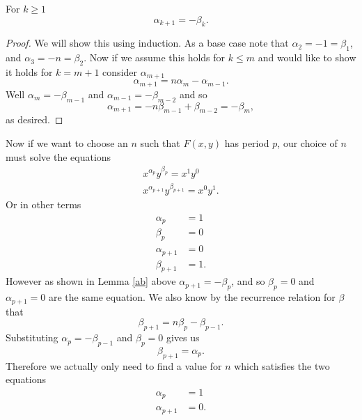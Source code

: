 \documentclass[12pt]{article}
\begin{document}
\begin{lemma} 
\label{ab} For $k\geq 1$
\begin{equation*}
\alpha_{k+1} = - \beta_{k}.
\end{equation*}
\end{lemma}
\begin{proof}
We will show this using induction. As a base case note that $\alpha_2 = -1 = \beta_1$, and $\alpha_3 = -n = \beta_2$. Now if we assume this holds for $k \leq m$ and would like to show it holds for $k = m+1$ consider $\alpha_{m+1}$
\begin{equation*}
\alpha_{m+1} = n \alpha_{m} - \alpha_{m-1}.
\end{equation*}
Well $\alpha_m = -\beta_{m-1}$ and $\alpha_{m-1} = - \beta_{m-2}$ and so 
\begin{equation*}
\alpha_{m+1} = - n \beta_{m-1} + \beta_{m-2} = -\beta_{m},
\end{equation*}
as desired.
\end{proof}
Now if we want to choose an $n$ such that  $F(x,y)$ has period $p$, our choice of $n$ must solve the equations 
\begin{align*}
x^{\alpha_p} y^{\beta_p} = x^{1}y^{0} \\
x^{\alpha_{p+1}} y^{\beta_{p+1}} = x^{0}y^{1}.
\end{align*}
Or in other terms
\begin{align*}
\alpha_p &=1 \\
\beta_p &=0\\ 
\alpha_{p+1} &= 0 \\
\beta_{p+1} &= 1.
\end{align*}
However as shown in Lemma \ref{ab} above $\alpha_{p+1} = -\beta_p$, and so $\beta_p=0$ and $\alpha_{p+1} =0$ are the same equation.  We also know by the recurrence relation for $\beta$ that 
\begin{equation*}
\beta_{p+1} = n \beta_{p} - \beta_{p-1}.
\end{equation*}
Substituting $\alpha_p = -\beta_{p-1}$ and $\beta_{p}=0$ gives us 
\begin{equation*}
\beta_{p+1} = \alpha_p.
\end{equation*} 
Therefore we actually only need to find a value for $n$ which satisfies the two equations
\begin{align*}
\alpha_p &=1\\
\alpha_{p+1}&=0.
\end{align*}
\end{document}
